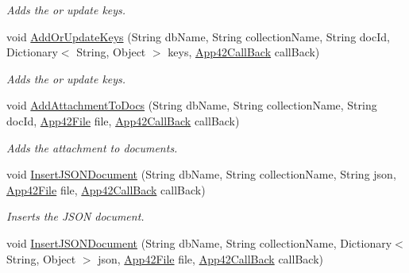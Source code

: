 \begin{DoxyCompactItemize}
\begin{DoxyCompactList}\small\item\em Adds the or update keys. \end{DoxyCompactList}\item 
void \hyperlink{classcom_1_1shephertz_1_1app42_1_1paas_1_1sdk_1_1csharp_1_1storage_1_1_storage_service_a1b8d0e967f9bd5915f17856a9d74e63f}{Add\+Or\+Update\+Keys} (String db\+Name, String collection\+Name, String doc\+Id, Dictionary$<$ String, Object $>$ keys, \hyperlink{interfacecom_1_1shephertz_1_1app42_1_1paas_1_1sdk_1_1csharp_1_1_app42_call_back}{App42\+Call\+Back} call\+Back)
\begin{DoxyCompactList}\small\item\em Adds the or update keys. \end{DoxyCompactList}\item 
void \hyperlink{classcom_1_1shephertz_1_1app42_1_1paas_1_1sdk_1_1csharp_1_1storage_1_1_storage_service_a0ff4726f6e1dda22434d3c3f5b245b85}{Add\+Attachment\+To\+Docs} (String db\+Name, String collection\+Name, String doc\+Id, \hyperlink{classcom_1_1shephertz_1_1app42_1_1paas_1_1sdk_1_1csharp_1_1_app42_file}{App42\+File} file, \hyperlink{interfacecom_1_1shephertz_1_1app42_1_1paas_1_1sdk_1_1csharp_1_1_app42_call_back}{App42\+Call\+Back} call\+Back)
\begin{DoxyCompactList}\small\item\em Adds the attachment to documents. \end{DoxyCompactList}\item 
void \hyperlink{classcom_1_1shephertz_1_1app42_1_1paas_1_1sdk_1_1csharp_1_1storage_1_1_storage_service_a8834d1bfcfc8e53e71ec4a90aceb1afa}{Insert\+J\+S\+O\+N\+Document} (String db\+Name, String collection\+Name, String json, \hyperlink{classcom_1_1shephertz_1_1app42_1_1paas_1_1sdk_1_1csharp_1_1_app42_file}{App42\+File} file, \hyperlink{interfacecom_1_1shephertz_1_1app42_1_1paas_1_1sdk_1_1csharp_1_1_app42_call_back}{App42\+Call\+Back} call\+Back)
\begin{DoxyCompactList}\small\item\em Inserts the J\+S\+O\+N document. \end{DoxyCompactList}\item 
void \hyperlink{classcom_1_1shephertz_1_1app42_1_1paas_1_1sdk_1_1csharp_1_1storage_1_1_storage_service_a5603694f773265d244b1b30d085f6ba6}{Insert\+J\+S\+O\+N\+Document} (String db\+Name, String collection\+Name, Dictionary$<$ String, Object $>$ json, \hyperlink{classcom_1_1shephertz_1_1app42_1_1paas_1_1sdk_1_1csharp_1_1_app42_file}{App42\+File} file, \hyperlink{interfacecom_1_1shephertz_1_1app42_1_1paas_1_1sdk_1_1csharp_1_1_app42_call_back}{App42\+Call\+Back} call\+Back)

\end{DoxyCompactItemize}
